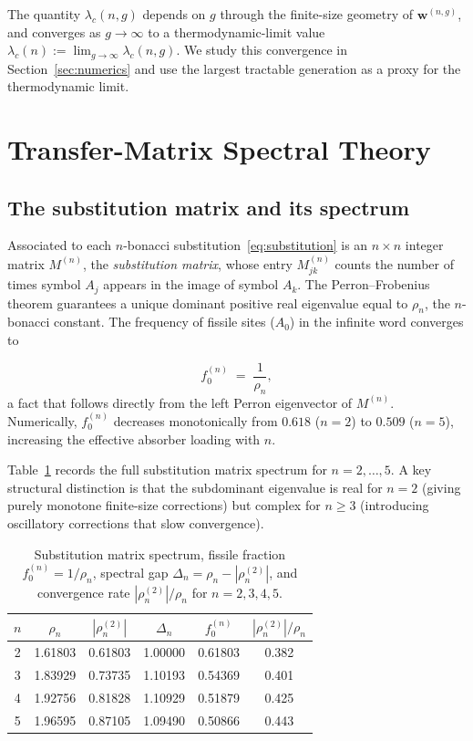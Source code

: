 \documentclass[11pt]{article}
\newcommand{\lc}{\lambda_c}
\newcommand{\rhon}{\rho_n}
\begin{document}
The quantity $\lc(n,g)$ depends on $g$ through the finite-size geometry of
$\mathbf{w}^{(n,g)}$, and converges as $g \to \infty$ to a
thermodynamic-limit value $\lc(n) := \lim_{g\to\infty}\lc(n,g)$.
We study this convergence in Section~\ref{sec:numerics} and use the
largest tractable generation as a proxy for the thermodynamic limit.

\section{Transfer-Matrix Spectral Theory}
\label{sec:spectral}

\subsection{The substitution matrix and its spectrum}
\label{sec:subst-matrix}

Associated to each $n$-bonacci substitution~\eqref{eq:substitution}
is an $n \times n$ integer matrix $M^{(n)}$, the \emph{substitution matrix},
whose entry $M^{(n)}_{jk}$ counts the number of times symbol $A_j$ appears
in the image of symbol $A_k$.
The Perron--Frobenius theorem guarantees a unique dominant positive real
eigenvalue equal to $\rhon$, the $n$-bonacci constant.
The frequency of fissile sites ($A_0$) in the infinite word converges to

\begin{equation}
  f_0^{(n)} \;=\; \frac{1}{\rhon},
  \label{eq:fissile-fraction}
\end{equation}
a fact that follows directly from the left Perron eigenvector of $M^{(n)}$.
Numerically, $f_0^{(n)}$ decreases monotonically from $0.618$ ($n=2$) to
$0.509$ ($n=5$), increasing the effective absorber loading with $n$.

Table~\ref{tab:spectral} records the full substitution matrix spectrum for
$n = 2, \ldots, 5$.
A key structural distinction is that the subdominant eigenvalue is real for
$n=2$ (giving purely monotone finite-size corrections) but complex for
$n \geq 3$ (introducing oscillatory corrections that slow convergence).

\begin{table}[h]
\centering
\caption{Substitution matrix spectrum, fissile fraction $f_0^{(n)} = 1/\rhon$,
         spectral gap $\Delta_n = \rhon - |\rho_n^{(2)}|$, and
         convergence rate $|\rho_n^{(2)}|/\rhon$ for $n = 2,3,4,5$.}
\label{tab:spectral}
\begin{tabular}{cccccc}
\toprule
$n$ & $\rhon$ & $|\rho_n^{(2)}|$ & $\Delta_n$ & $f_0^{(n)}$ & $|\rho_n^{(2)}|/\rhon$ \\
\midrule
2 & 1.61803 & 0.61803 & 1.00000 & 0.61803 & 0.382 \\
3 & 1.83929 & 0.73735 & 1.10193 & 0.54369 & 0.401 \\
4 & 1.92756 & 0.81828 & 1.10929 & 0.51879 & 0.425 \\
5 & 1.96595 & 0.87105 & 1.09490 & 0.50866 & 0.443 \\
\bottomrule
\end{tabular}
\end{table}
\end{document}
